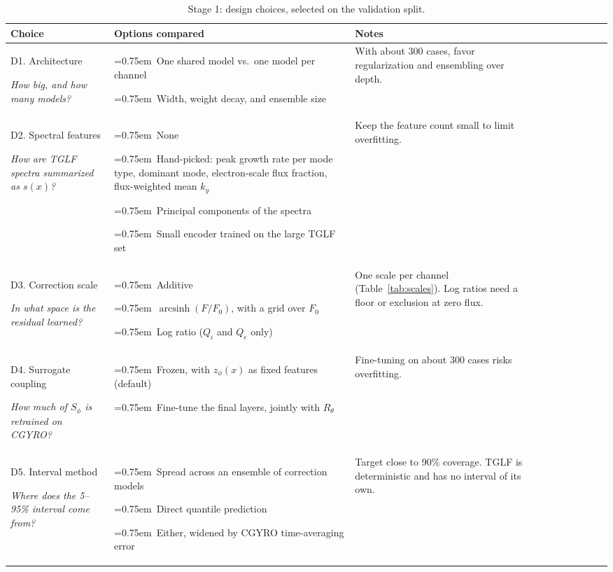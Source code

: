\documentclass[10pt,letterpaper]{article}
\newcommand{\opt}{\par\hangindent=0.75em\hangafter=1\noindent\textbullet~}
\newcommand{\q}[1]{\par{\normalfont\itshape #1}}
\newcommand{\rowsep}{\\ \specialrule{0.4pt}{4pt}{4pt}}
\newcommand{\tablestyle}{\small\renewcommand{\arraystretch}{1.15}\setlength{\parskip}{0pt}}
\begin{document}
\begin{table}[!tp]
      \tablestyle
      \caption{Stage 1: design choices, selected on the validation split.}
      \label{tab:design}
      \begin{tabular}{@{}B{1.3in}L{3.05in}L{2.2in}@{}}
            \toprule
            Choice & \textbf{Options compared} & \textbf{Notes} \\
            \midrule
            D1. Architecture \q{How big, and how many models?} &
            \opt One shared model vs.\ one model per channel
            \opt Width, weight decay, and ensemble size &
            With about 300 cases, favor regularization and ensembling over depth.
            \rowsep
            D2. Spectral features \q{How are TGLF spectra summarized as $s(x)$?} &
            \opt None
            \opt Hand-picked: peak growth rate per mode type, dominant mode, electron-scale flux fraction, flux-weighted mean $k_y$
            \opt Principal components of the spectra
            \opt Small encoder trained on the large TGLF set &
            Keep the feature count small to limit overfitting.
            \rowsep
            D3. Correction scale \q{In what space is the residual learned?} &
            \opt Additive
            \opt $\operatorname{arcsinh}(F/F_0)$, with a grid over $F_0$
            \opt Log ratio ($Q_i$ and $Q_e$ only) &
            One scale per channel (Table~\ref{tab:scales}). Log ratios need a floor or exclusion at zero flux.
            \rowsep
            D4. Surrogate coupling \q{How much of $S_\phi$ is retrained on CGYRO?} &
            \opt Frozen, with $z_\phi(x)$ as fixed features (default)
            \opt Fine-tune the final layers, jointly with $R_\theta$ &
            Fine-tuning on about 300 cases risks overfitting.
            \rowsep
            D5. Interval method \q{Where does the 5--95\% interval come from?} &
            \opt Spread across an ensemble of correction models
            \opt Direct quantile prediction
            \opt Either, widened by CGYRO time-averaging error &
            Target close to 90\% coverage. TGLF is deterministic and has no interval of its own.
            \\
            \bottomrule
      \end{tabular}
\end{table}
\end{document}
